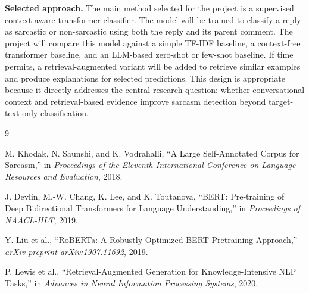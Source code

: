 \documentclass[%
 reprint,
 amsmath,amssymb,
 aps,
]{revtex4-2}
\begin{document}
\textbf{Selected approach.} The main method selected for the project is a supervised context-aware transformer classifier. The model will be trained to classify a reply as sarcastic or non-sarcastic using both the reply and its parent comment. The project will compare this model against a simple TF-IDF baseline, a context-free transformer baseline, and an LLM-based zero-shot or few-shot baseline. If time permits, a retrieval-augmented variant will be added to retrieve similar examples and produce explanations for selected predictions. This design is appropriate because it directly addresses the central research question: whether conversational context and retrieval-based evidence improve sarcasm detection beyond target-text-only classification.














\begin{thebibliography}{9}

M. Khodak, N. Saunshi, and K. Vodrahalli, ``A Large Self-Annotated Corpus for Sarcasm,'' in \emph{Proceedings of the Eleventh International Conference on Language Resources and Evaluation}, 2018.

J. Devlin, M.-W. Chang, K. Lee, and K. Toutanova, ``BERT: Pre-training of Deep Bidirectional Transformers for Language Understanding,'' in \emph{Proceedings of NAACL-HLT}, 2019.

Y. Liu et al., ``RoBERTa: A Robustly Optimized BERT Pretraining Approach,'' \emph{arXiv preprint arXiv:1907.11692}, 2019.

P. Lewis et al., ``Retrieval-Augmented Generation for Knowledge-Intensive NLP Tasks,'' in \emph{Advances in Neural Information Processing Systems}, 2020.

\end{thebibliography}
\end{document}
